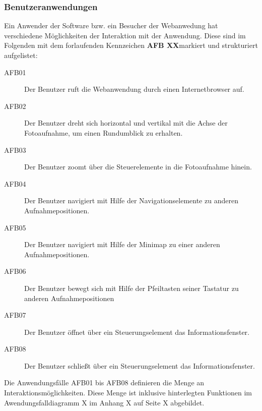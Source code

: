 \subsubsection{Benutzeranwendungen}
\label{sec:Benutzeranwendungen}

Ein Anwender der Software bzw. ein Besucher der Webanwedung hat verschiedene Möglichkeiten der Interaktion mit der Anwendung. Diese sind im Folgenden mit dem forlaufenden Kennzeichen \textbf{AFB XX}\footnotemark markiert und strukturiert aufgelistet:


\begin{description}
  \item[AFB01] Der Benutzer ruft die Webanwendung durch einen Internetbrowser auf.
  \item[AFB02] Der Benutzer dreht sich horizontal und vertikal mit die Achse der Fotoaufnahme, um einen Rundumblick zu erhalten.
  \item[AFB03] Der Benutzer zoomt über die Steuerelemente in die Fotoaufnahme hinein.
  \item[AFB04] Der Benutzer navigiert mit Hilfe der Navigationselemente zu anderen Aufnahmepositionen.
  \item[AFB05] Der Benutzer navigiert mit Hilfe der Minimap zu einer anderen Aufnahmepositionen.
  \item[AFB06] Der Benutzer bewegt sich mit Hilfe der Pfeiltasten seiner Tastatur zu anderen Aufnahmepositionen
  \item[AFB07] Der Benutzer öffnet über ein Steuerungselement das Informationsfenster.
  \item[AFB08] Der Benutzer schließt über ein Steuerungselement das Informationsfenster.
\end{description}

Die Anwendungsfälle AFB01 bis AFB08 definieren die Menge an Interaktionsmöglichkeiten. Diese Menge ist inklusive hinterlegten Funktionen im Awendungsfalldiagramm X im Anhang X auf Seite X abgebildet.